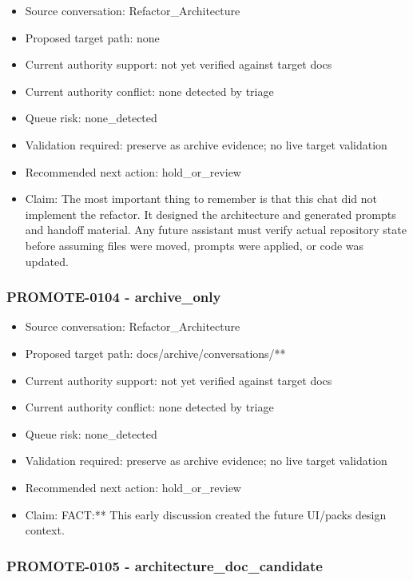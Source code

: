 \documentclass[11pt,a4paper]{report}
\begin{document}
\begin{itemize}
\item Source conversation: Refactor\_Architecture
\item Proposed target path: none
\item Current authority support: not yet verified against target docs
\item Current authority conflict: none detected by triage
\item Queue risk: none\_detected
\item Validation required: preserve as archive evidence; no live target validation
\item Recommended next action: hold\_or\_review
\item Claim: The most important thing to remember is that this chat did not implement the refactor. It designed the architecture and generated prompts and handoff material. Any future assistant must verify actual repository state before assuming files were moved, prompts were applied, or code was updated.
\end{itemize}

\subsubsection{PROMOTE-0104 - archive\_only}

\begin{itemize}
\item Source conversation: Refactor\_Architecture
\item Proposed target path: docs/archive/conversations/**
\item Current authority support: not yet verified against target docs
\item Current authority conflict: none detected by triage
\item Queue risk: none\_detected
\item Validation required: preserve as archive evidence; no live target validation
\item Recommended next action: hold\_or\_review
\item Claim: FACT:** This early discussion created the future UI/packs design context.
\end{itemize}

\subsubsection{PROMOTE-0105 - architecture\_doc\_candidate}
\end{document}
